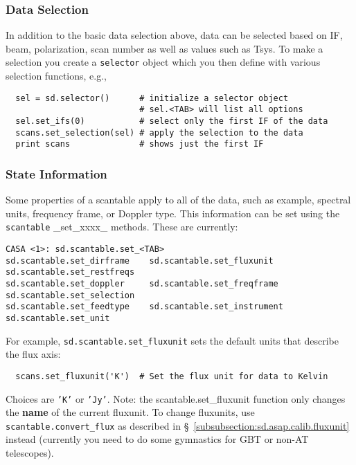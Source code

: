 \subsubsection{Data Selection}
\label{subsubsection:sd.asap.scantable.select}

In addition to the basic data selection above, data can be selected
based on IF, beam, polarization, scan number as well as values such as
Tsys.  To make a selection you create a {\tt selector} object which
you then define with various selection functions, e.g.,

\small
\begin{verbatim}
  sel = sd.selector()      # initialize a selector object
                           # sel.<TAB> will list all options
  sel.set_ifs(0)           # select only the first IF of the data
  scans.set_selection(sel) # apply the selection to the data
  print scans              # shows just the first IF
\end{verbatim}
\normalsize

\subsubsection{State Information}
\label{subsubsection:sd.asap.scantable.state}

Some properties of a scantable apply to all of the data, such as
example, spectral units, frequency frame, or Doppler type. This
information can be set using the {\tt scantable} \_set\_xxxx\_
methods.  These are currently:
\small
\begin{verbatim}
CASA <1>: sd.scantable.set_<TAB>
sd.scantable.set_dirframe    sd.scantable.set_fluxunit    sd.scantable.set_restfreqs   
sd.scantable.set_doppler     sd.scantable.set_freqframe   sd.scantable.set_selection   
sd.scantable.set_feedtype    sd.scantable.set_instrument  sd.scantable.set_unit
\end{verbatim}
\normalsize

For example, {\tt sd.scantable.set\_fluxunit} sets the default units
that describe the flux axis:
\small
\begin{verbatim}
  scans.set_fluxunit('K')  # Set the flux unit for data to Kelvin
\end{verbatim}
\normalsize
Choices are {\tt 'K'} or {\tt 'Jy'}.
Note: the scantable.set\_fluxunit function only changes the {\bf name}
of the current fluxunit. To change fluxunits, use 
{\tt scantable.convert\_flux} as described in 
\S~\ref{subsubsection:sd.asap.calib.fluxunit}
instead (currently you need to do some gymnastics for GBT or non-AT
telescopes).

